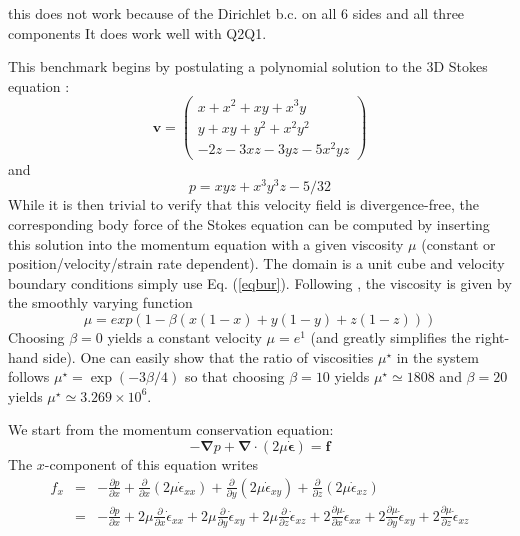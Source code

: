 
{\color{red} this does not work because of the Dirichlet b.c. on all 6 sides and all three components}
It does work well with Q2Q1.

This benchmark begins by postulating a polynomial solution to the 3D Stokes equation \cite{dobo04}:
\begin{equation}
{\bm v}
=
\left(
\begin{array}{c}
x+x^2+xy+x^3y \\
y + xy + y^2 + x^2 y^2\\
-2z - 3xz - 3yz - 5x^2 yz
\end{array}
\right)
\label{eqbur}
\end{equation}
and
\begin{equation}
p = xyz + x^3 y^3z - 5/32
\end{equation}
While it is then trivial to verify that this velocity field is divergence-free,  
the corresponding body force of the Stokes equation can be computed by 
inserting this solution into the momentum equation with a given viscosity $\mu$
(constant or position/velocity/strain rate dependent). 
The domain is a unit cube and velocity boundary conditions 
simply use Eq. (\ref{eqbur}). 
Following \cite{busa13}, the viscosity
is given by the smoothly varying function
\begin{equation}
\mu = exp(1 - \beta(x(1 - x) + y(1 - y) + z(1 - z)))
\end{equation}
Choosing $\beta=0$ yields a constant velocity $\mu=e^1$ (and greatly simplifies the right-hand side).
One can easily show that the ratio of viscosities $\mu^\star$
in the system follows $\mu^\star=\exp(-3\beta/4)$ so that choosing $\beta=10$ yields
$\mu^\star\simeq 1808$ and $\beta=20$ yields $\mu^\star\simeq 3.269\times10^6$.


We start from the momentum conservation equation:
\[
-{\bm \nabla}p + {\bm \nabla}\cdot (2 \mu \dot{\bm \epsilon}) = {\bm f}
\]
The $x$-component of this equation writes
\begin{eqnarray}
f_x 
&=& -\frac{\partial p}{\partial x} 
+\frac{\partial}{\partial x} (2\mu \dot{\epsilon}_{xx})
+\frac{\partial}{\partial y} (2\mu \dot{\epsilon}_{xy})
+\frac{\partial}{\partial z} (2\mu \dot{\epsilon}_{xz}) \\
&=& 
-\frac{\partial p}{\partial x} 
+2\mu\frac{\partial}{\partial x} \dot{\epsilon}_{xx}
+2\mu\frac{\partial}{\partial y} \dot{\epsilon}_{xy}
+2\mu\frac{\partial}{\partial z} \dot{\epsilon}_{xz} 
+2\frac{\partial \mu}{\partial x} \dot{\epsilon}_{xx}
+2\frac{\partial \mu}{\partial y} \dot{\epsilon}_{xy}
+2\frac{\partial \mu}{\partial z} \dot{\epsilon}_{xz} 
\end{eqnarray}


